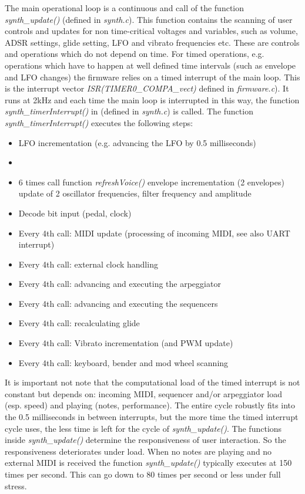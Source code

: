 \documentclass[portrait, 11pt, oneside]{report}
\begin{document}
The main operational loop is a continuous and call of the function \textit{synth\_update()} (defined in \textit{synth.c}). This function contains the scanning of user controls and updates for non time-critical voltages and variables, such as volume, ADSR settings, glide setting, LFO and vibrato frequencies etc. These are controls and operations which do not depend on time. For timed operations, e.g. operations which have to happen at well defined time intervals (such as envelope and LFO changes) the firmware relies on a timed interrupt of the main loop. This is the interrupt vector \textit{ISR(TIMER0\_COMPA\_vect)} defined in \textit{firmware.c}). It runs at 2kHz and each time the main loop is interrupted in this way, the function \textit{synth\_timerInterrupt()} in (defined in \textit{synth.c}) is called. The function \textit{synth\_timerInterrupt()} executes the following steps:

\begin{itemize}
  \item LFO incrementation (e.g. advancing the LFO by 0.5 milliseconds) 
  \item 
  \item 6 times call function \textit{refreshVoice()}
  \subitem envelope incrementation (2 envelopes) 
  \subitem update of 2 oscillator frequencies, filter frequency and amplitude 
  \item Decode bit input (pedal, clock)
  \item Every 4th call: MIDI update (processing of incoming MIDI, see also UART interrupt)
  \item Every 4th call: external clock handling
  \item Every 4th call: advancing and executing the arpeggiator
  \item Every 4th call: advancing and executing the sequencers
  \item Every 4th call: recalculating glide 
  \item Every 4th call: Vibrato incrementation (and PWM update)
  \item Every 4th call: keyboard, bender and mod wheel scanning  
\end{itemize}

It is important not note that the computational load of the timed interrupt is not constant but depends on: incoming MIDI, sequencer and/or arpeggiator load (esp. speed) and playing (notes, performance). The entire cycle robustly fits into the 0.5 milliseconds in between interrupts, but the more time the timed interrupt cycle uses, the less time is left for the cycle of \textit{synth\_update()}. The functions inside \textit{synth\_update()} determine the responsiveness of user interaction. So the responsiveness deteriorates under load. When no notes are playing and no external MIDI is received the function \textit{synth\_update()} typically executes at 150 times per second. This can go down to 80 times per second or less under full stress.
\end{document}
